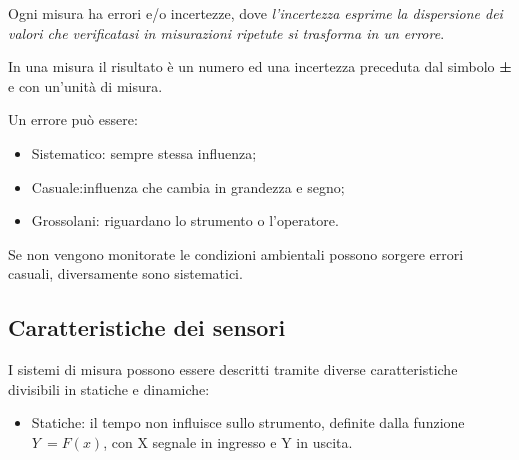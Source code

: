 Ogni misura ha errori e/o incertezze, dove \emph{l'incertezza esprime la
dispersione dei valori che verificatasi in misurazioni ripetute si
trasforma in un errore}.

In una misura il risultato è un numero ed una incertezza preceduta dal
simbolo \textbf{±} e con un'unità di misura.

Un errore può essere:

\begin{itemize}
\item
  Sistematico: sempre stessa influenza;
\item
  Casuale:influenza che cambia in grandezza e segno;
\item
  Grossolani: riguardano lo strumento o l'operatore.
\end{itemize}

Se non vengono monitorate le condizioni ambientali possono sorgere
errori casuali, diversamente sono sistematici.

\subsection{Caratteristiche dei
sensori}\label{caratteristiche-dei-sensori}

I sistemi di misura possono essere descritti tramite diverse
caratteristiche divisibili in statiche e dinamiche:

\begin{itemize}
\item
  Statiche: il tempo non influisce sullo strumento, definite dalla
  funzione \(Y\  = F(x)\), con X segnale in ingresso e Y in uscita.
\end{itemize}

